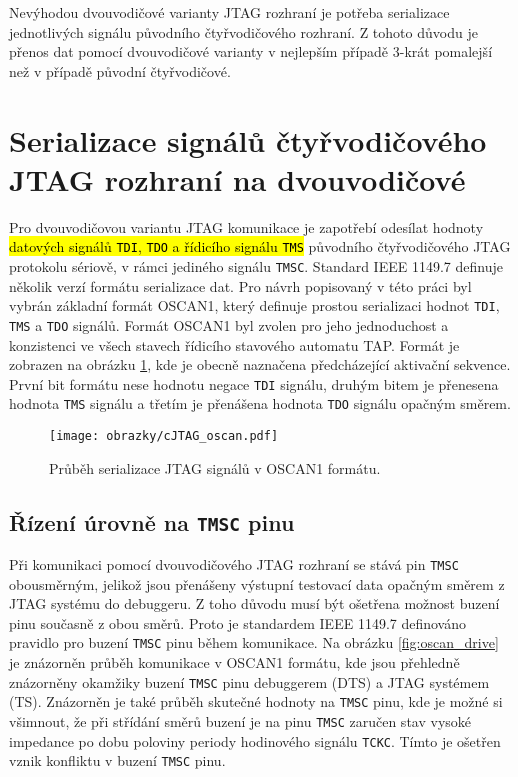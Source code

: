 Nevýhodou dvouvodičové varianty \acs{JTAG} rozhraní je potřeba serializace jednotlivých signálu původního čtyřvodičového rozhraní. Z tohoto důvodu je přenos dat pomocí dvouvodičové varianty v nejlepším případě 3-krát pomalejší než v případě původní čtyřvodičové. \cite{IEEE_1149-7}

\section{Serializace signálů čtyřvodičového \acs{JTAG} rozhraní na dvouvodičové}	\label{sec:oscan1} 
Pro dvouvodičovou variantu \acs{JTAG} komunikace je zapotřebí odesílat hodnoty \hl{datových signálů {\texttt{\acs{TDI}}}, {\texttt{\acs{TDO}}} a řídicího signálu {\texttt{\acs{TMS}}}} původního čtyřvodičového \acs{JTAG} protokolu sériově, v rámci jediného signálu \texttt{\acs{TMSC}}. Standard IEEE 1149.7 definuje několik verzí formátu serializace dat. Pro návrh popisovaný v této práci byl vybrán základní formát OSCAN1, který definuje prostou serializaci hodnot \texttt{\acs{TDI}}, \texttt{\acs{TMS}} a \texttt{\acs{TDO}} signálů. Formát OSCAN1 byl zvolen pro jeho jednoduchost a konzistenci ve všech stavech řídicího stavového automatu \acs{TAP}. Formát je zobrazen na obrázku \ref{fig:oscan}, kde je obecně naznačena předcházející aktivační sekvence. První bit formátu nese hodnotu negace \texttt{\acs{TDI}} signálu, druhým bitem je přenesena hodnota \texttt{\acs{TMS}} signálu a třetím je přenášena hodnota \texttt{\acs{TDO}} signálu opačným směrem. \cite{IEEE_1149-7}

\begin{figure}[!h]
  \begin{center}
    \texttt{[image: obrazky/cJTAG\_oscan.pdf]}
  \end{center}
  \caption{Průběh serializace \acs{JTAG} signálů v OSCAN1 formátu.}
	\label{fig:oscan}
\end{figure}
    
\subsection{Řízení úrovně na \texttt{\acs{TMSC}} pinu}	\label{subsec:oscan1_drive} 
Při komunikaci pomocí dvouvodičového \acs{JTAG} rozhraní se stává pin \texttt{\acs{TMSC}} obousměrným, jelikož jsou přenášeny výstupní testovací data opačným směrem z \acs{JTAG} systému do debuggeru. Z toho důvodu musí být ošetřena možnost buzení pinu současně z obou směrů. Proto je standardem IEEE 1149.7 definováno pravidlo pro buzení \texttt{\acs{TMSC}} pinu během komunikace. Na obrázku \ref{fig:oscan_drive} je znázorněn průběh komunikace v OSCAN1 formátu, kde jsou přehledně znázorněny okamžiky buzení \texttt{\acs{TMSC}} pinu debuggerem (\acs{DTS}) a \acs{JTAG} systémem (\acs{TS}). Znázorněn je také průběh skutečné hodnoty na \texttt{\acs{TMSC}} pinu, kde je možné si všimnout, že při střídání směrů buzení je na pinu \texttt{\acs{TMSC}} zaručen stav vysoké impedance po dobu poloviny periody hodinového signálu \texttt{\acs{TCKC}}. Tímto je ošetřen vznik konfliktu v buzení \texttt{\acs{TMSC}} pinu. \cite{IEEE_1149-7}

